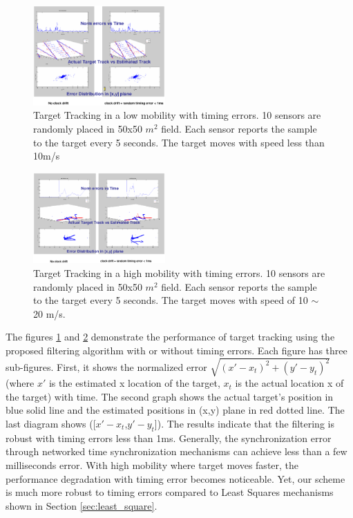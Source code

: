  \begin{figure}
    \begin{center}

    \includegraphics[height=0.45\textheight,width=0.45\textwidth,bbllx=38,bblly=254,bburx=510,bbury=605]{figures/estimationlow}
    \caption{Target Tracking in a low mobility with timing errors. 10 sensors are randomly placed in 50x50 $m^2$ field. Each sensor reports the sample to the target every 5 seconds. The target moves with speed less than 10m/s}
        \label{fig:estimation_low}
    \end{center}
\end{figure}

\begin{figure}
    \begin{center}

    \includegraphics[height=0.45\textheight,width=0.45\textwidth,bbllx=51,bblly=262,bburx=588,bbury=615]{figures/estimationhigh}
    \caption{Target Tracking in a high mobility with timing errors. 10 sensors are randomly placed in 50x50 $m^2$ field. Each sensor reports the sample to the target every 5 seconds. The target moves with speed of 10 $\sim$ 20 m/s. }
        \label{fig:estimation_high}
    \end{center}
\end{figure}

The figures \ref{fig:estimation_low} and \ref{fig:estimation_high}
demonstrate the performance of target tracking using the proposed
filtering algorithm with or without timing errors. Each figure has
three sub-figures. First, it shows the normalized error
$\sqrt{(x'-x_t)^2+(y'-y_t)^2}$ (where $x'$ is the estimated x
location of the target, $x_t$ is the actual location x of the
target) with time. The second graph shows the actual target's
position in blue solid line and the estimated positions in (x,y)
plane in red dotted line. The last diagram shows
([$x'-x_t$,$y'-y_t$]). The results indicate that the filtering is
robust with timing errors less than 1ms. Generally, the
synchronization error through networked time synchronization
mechanisms can achieve less than a few milliseconds error. With high
mobility where target moves faster, the performance degradation with
timing error becomes noticeable. Yet, our scheme is much more robust
to timing errors compared to Least Squares mechanisms shown in
Section \ref{sec:least_square}.

